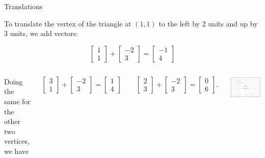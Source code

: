 \documentclass[xcolor=dvipsnames,aspectratio=169,t]{beamer}
\begin{document}
\begin{frame}{Translations}

To translate the vertex of the triangle at $(1,1)$  to the left by 2 units and up by 3 units, \alert{we add vectors}:

\[ \begin{bmatrix} 1 \\ 1\end{bmatrix} + \begin{bmatrix} -2 \\ 3 \end{bmatrix} = \begin{bmatrix} -1 \\ 4 \end{bmatrix}\]

\begin{columns}

\column{0.5\tw}

Doing the same for the other two vertices, we have

\[ \begin{bmatrix} 3 \\ 1\end{bmatrix} + \begin{bmatrix} -2 \\ 3 \end{bmatrix} = \begin{bmatrix} 1 \\ 4 \end{bmatrix} \qquad
\begin{bmatrix} 2 \\ 3\end{bmatrix} + \begin{bmatrix} -2 \\ 3 \end{bmatrix} = \begin{bmatrix} 0 \\ 6 \end{bmatrix}.\]


\column{0.5\tw}

\includegraphics[width=0.9\tw]{images/fig-triangle-shift.png}

\end{columns}

\end{frame}
\end{document}
